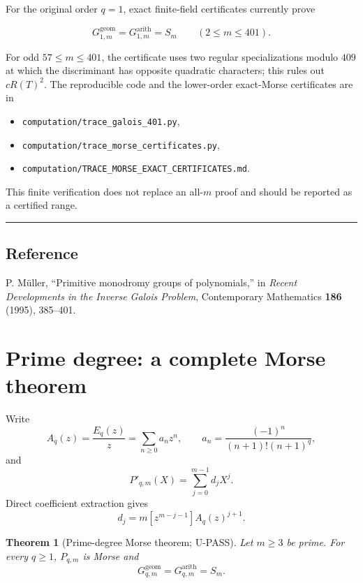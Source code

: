 \documentclass[11pt]{article}
\theoremstyle{keio}
\newtheorem{theorem}{Theorem}[section]
\theoremstyle{definition}
\theoremstyle{remark}
\providecommand{\tightlist}{\setlength{\itemsep}{0pt}\setlength{\parskip}{0pt}}
\newcommand{\UPASS}{\textcolor{keiogreen}{\textsf{U-PASS}}}
\begin{document}
For the original order \(q=1\), exact finite-field certificates currently
prove

\[
 G^{\mathrm{geom}}_{1,m}=G^{\mathrm{arith}}_{1,m}=S_m
 \qquad(2\leq m\leq401).
\]

For odd \(57\leq m\leq401\), the certificate uses two regular
specializations modulo \(409\) at which the discriminant has opposite
quadratic characters; this rules out \(cR(T)^2\). The reproducible code and
the lower-order exact-Morse certificates are in

\begin{itemize}
\tightlist
\item
  \texttt{computation/trace\_galois\_401.py},
\item
  \texttt{computation/trace\_morse\_certificates.py},
\item
  \texttt{computation/TRACE\_MORSE\_EXACT\_CERTIFICATES.md}.
\end{itemize}

This finite verification does not replace an all-\(m\) proof and should be
reported as a certified range.

\begin{center}\rule{0.5\linewidth}{0.5pt}\end{center}

\subsection{Reference}

P. Müller, ``Primitive monodromy groups of polynomials,'' in \emph{Recent
Developments in the Inverse Galois Problem}, Contemporary Mathematics \textbf{186}
(1995), 385--401.
\section{Prime degree: a complete Morse theorem}

Write
\[
A_q(z)=\frac{E_q(z)}z
=\sum_{n\ge0}a_nz^n,
\qquad
a_n=\frac{(-1)^n}{(n+1)!(n+1)^q},
\]
and
\[
P'_{q,m}(X)=\sum_{j=0}^{m-1}d_jX^j.
\]
Direct coefficient extraction gives
\begin{equation}
\boxed{d_j=m[z^{m-j-1}]A_q(z)^{j+1}.}
\label{eq:dj}
\end{equation}

\begin{theorem}[Prime-degree Morse theorem; \UPASS]\label{thm:prime}
Let $m\ge3$ be prime. For every $q\ge1$, $P_{q,m}$ is Morse and
\begin{equation}
\boxed{G^{\mathrm{geom}}_{q,m}=G^{\mathrm{arith}}_{q,m}=S_m.}
\label{eq:prime-mon}
\end{equation}
\end{theorem}
\end{document}
